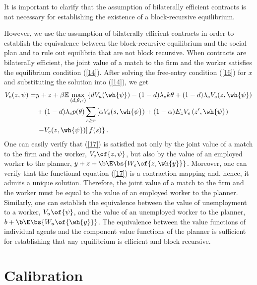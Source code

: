 \documentclass[12pt]{article}
\newcommand{\CiteReference}{../reference.bib}
\theoremstyle{definition}
\begin{document}
It is important to clarify that the assumption of bilaterally efficient contracts is not necessary for establishing the existence of a block-recursive equilibrium. 

However, we use the assumption of bilaterally efficient contracts in order to establish the equivalence between the block-recursive equilibrium and the social plan and to rule out equilibria that are not block recursive. When contracts are bilaterally efficient, the joint value of a match to the firm and the worker satisfies the equilibrium condition (\ref{14}). After solving the free-entry condition (\ref{16}) for $x$ and substituting the solution into (\ref{14}), we get
\begin{equation}
    \label{17}
    \begin{aligned}
        V_e(z, \psi)= & y+z+\beta \mathbb{E} \max _{(d, \theta, r)}\left\{d V_u(\wh{\psi})-(1-d) \lambda_e k \theta+(1-d) \lambda_e V_e(z, \wh{\psi})\right. \\
        & +(1-d) \lambda_e p(\theta) \sum_{s \geq r}\left[\alpha V_e(s, \wh{\psi})+(1-\alpha) E_z V_e\left(z^{\prime}, \wh{\psi}\right)\right. \\
        & \left.\left.-V_e(z, \wh{\psi})\right] f(s)\right\} .
    \end{aligned}
\end{equation}
One can easily verify that (\ref{17}) is satisfied not only by the joint value of a match to the firm and the worker, $V_e\of{z, \psi}$, but also by the value of an employed worker to the planner, $y+z+\b\E\bs{W_e\of{z, \wh{y}}}$. Moreover, one can verify that the functional equation (\ref{17}) is a contraction mapping and, hence, it admits a unique solution. Therefore, the joint value of a match to the firm and the worker must be equal to the value of an employed worker to the planner. Similarly, one can establish the equivalence between the value of unemployment to a worker, $V_u\of{\psi}$, and the value of an unemployed worker to the planner, $b + \b \E\bs{W_u\of{\wh{y}}}$. The equivalence between the value functions of individual agents and the component value functions of the planner is sufficient for establishing that any equilibrium is efficient and block recursive.


\section{Calibration}



 
\end{document}
